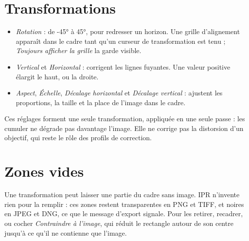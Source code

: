 \section{Transformations}
\begin{itemize}
\item \emph{Rotation} : de -45° à 45°, pour redresser un horizon. Une grille
d’alignement apparaît dans le cadre tant qu’un curseur de transformation est tenu ;
\emph{Toujours afficher la grille} la garde visible.
\item \emph{Vertical} et \emph{Horizontal} : corrigent les lignes fuyantes. Une valeur
positive élargit le haut, ou la droite.
\item \emph{Aspect}, \emph{Échelle}, \emph{Décalage horizontal} et \emph{Décalage
vertical} : ajustent les proportions, la taille et la place de l’image dans le cadre.
\end{itemize}
Ces réglages forment une seule transformation, appliquée en une seule passe : les
cumuler ne dégrade pas davantage l’image. Elle ne corrige pas la distorsion d’un
objectif, qui reste le rôle des profils de correction.

\section{Zones vides}
Une transformation peut laisser une partie du cadre sans image. IPR n’invente rien
pour la remplir : ces zones restent transparentes en PNG et TIFF, et noires en JPEG
et DNG, ce que le message d’export signale. Pour les retirer, recadrer, ou cocher
\emph{Contraindre à l’image}, qui réduit le rectangle autour de son centre jusqu’à
ce qu’il ne contienne que l’image.

